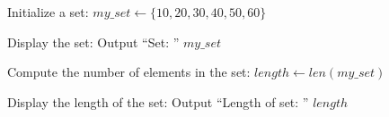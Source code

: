 \begin{algorithm}
\caption{Find the Length of a Set}
\begin{algorithmic}[1]

\STATE Initialize a set:
\STATE $my\_set \gets \{10, 20, 30, 40, 50, 60\}$

\STATE Display the set:
\STATE Output ``Set: '' $my\_set$

\STATE Compute the number of elements in the set:
\STATE $length \gets len(my\_set)$

\STATE Display the length of the set:
\STATE Output ``Length of set: '' $length$

\end{algorithmic}
\end{algorithm}